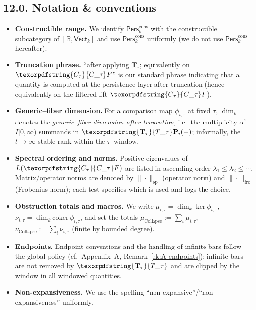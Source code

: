 \documentclass[11pt]{article}
\DeclareRobustCommand{\hyp}{\nobreakdash-}
\newcommand{\Pers}{\mathsf{Pers}}
\numberwithin{equation}{section}
\theoremstyle{definition}
\DeclareRobustCommand{\Perskft}{\Pers^{\mathrm{cons}}_{k}}
\DeclareRobustCommand{\Ttau}{\texorpdfstring{\ensuremath{\mathbf{T}_{\tau}}}{T\_\tau}}
\DeclareRobustCommand{\Ctau}{\texorpdfstring{\ensuremath{C_{\tau}}}{C\_\tau}}
\DeclareRobustCommand{\muc}{\mu_{\mathrm{Collapse}}}
\DeclareRobustCommand{\nuc}{\nu_{\mathrm{Collapse}}}
\begin{document}
\subsection*{12.0. Notation \& conventions}
\begin{itemize}
  \item \textbf{Constructible range.} We identify \(\Perskft\) with the constructible subcategory of \([\mathbb{R},\mathsf{Vect}_k]\) and use \(\Perskft\) uniformly (we do not use \(\Pers^{\mathrm{cons}}_k\) hereafter).
  \item \textbf{Truncation phrase.} “after applying \(\mathbf{T}_\tau\); equivalently on \(\Ctau F\)” is our standard phrase indicating that a quantity is computed at the persistence layer after truncation (hence equivalently on the filtered lift \(\Ctau F\)).
  \item \textbf{Generic–fiber dimension.} For a comparison map \(\phi_{i,\tau}\) at fixed \(\tau\), \(\dim_k\) denotes the \emph{generic–fiber dimension after truncation}, i.e.\ the multiplicity of \(I[0,\infty)\) summands in \(\Ttau\mathbf{P}_i(-)\); informally, the \(t\to\infty\) stable rank within the \(\tau\)–window.
  \item \textbf{Spectral ordering and norms.} Positive eigenvalues of \(L(\Ctau F)\) are listed in ascending order \(\lambda_1\le \lambda_2\le\cdots\). Matrix/operator norms are denoted by \(\|\cdot\|_{\mathrm{op}}\) (operator norm) and \(\|\cdot\|_{\mathrm{fro}}\) (Frobenius norm); each test specifies which is used and logs the choice.
  \item \textbf{Obstruction totals and macros.} We write \(\mu_{i,\tau}=\dim_k\ker\phi_{i,\tau}\), \(\nu_{i,\tau}=\dim_k\mathrm{coker}\,\phi_{i,\tau}\), and set the totals \(\muc:=\sum_i\mu_{i,\tau}\), \(\nuc:=\sum_i\nu_{i,\tau}\) (finite by bounded degree).
  \item \textbf{Endpoints.} Endpoint conventions and the handling of infinite bars follow the global policy (cf.\ Appendix~A, Remark~\ref{rk:A-endpoints}); infinite bars are not removed by \(\Ttau\) and are clipped by the window in all windowed quantities.
  \item \textbf{Non\hyp expansiveness.} We use the spelling “non\hyp expansive”/“non\hyp expansiveness” uniformly.
\end{itemize}
\end{document}
